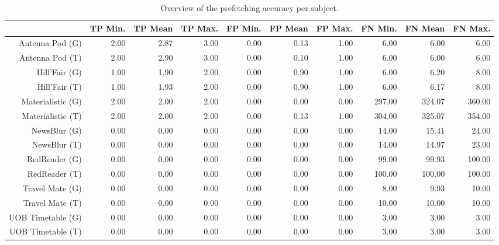 \begin{table}[ht]
\centering
\begin{tabular}{rrrrrrrrrr}
  \hline
 & TP Min. & TP Mean & TP Max. & FP Min. & FP Mean & FP Max. & FN Min. & FN Mean & FN Max. \\ 
  \hline
Antenna Pod (G) & 2.00 & 2.87 & 3.00 & 0.00 & 0.13 & 1.00 & 6.00 & 6.00 & 6.00 \\ 
  Antenna Pod (T) & 2.00 & 2.90 & 3.00 & 0.00 & 0.10 & 1.00 & 6.00 & 6.00 & 6.00 \\ 
  Hill'Fair (G) & 1.00 & 1.90 & 2.00 & 0.00 & 0.90 & 1.00 & 6.00 & 6.20 & 8.00 \\ 
  Hill'Fair (T) & 1.00 & 1.93 & 2.00 & 0.00 & 0.90 & 1.00 & 6.00 & 6.17 & 8.00 \\ 
  Materialistic (G) & 2.00 & 2.00 & 2.00 & 0.00 & 0.00 & 0.00 & 297.00 & 324.07 & 360.00 \\ 
  Materialistic (T) & 2.00 & 2.00 & 2.00 & 0.00 & 0.13 & 1.00 & 304.00 & 325.07 & 354.00 \\ 
  NewsBlur (G) & 0.00 & 0.00 & 0.00 & 0.00 & 0.00 & 0.00 & 14.00 & 15.41 & 24.00 \\ 
  NewsBlur (T) & 0.00 & 0.00 & 0.00 & 0.00 & 0.00 & 0.00 & 14.00 & 14.97 & 23.00 \\ 
  RedReader (G) & 0.00 & 0.00 & 0.00 & 0.00 & 0.00 & 0.00 & 99.00 & 99.93 & 100.00 \\ 
  RedReader (T) & 0.00 & 0.00 & 0.00 & 0.00 & 0.00 & 0.00 & 100.00 & 100.00 & 100.00 \\ 
  Travel Mate (G) & 0.00 & 0.00 & 0.00 & 0.00 & 0.00 & 0.00 & 8.00 & 9.93 & 10.00 \\ 
  Travel Mate (T) & 0.00 & 0.00 & 0.00 & 0.00 & 0.00 & 0.00 & 10.00 & 10.00 & 10.00 \\ 
  UOB Timetable (G) & 0.00 & 0.00 & 0.00 & 0.00 & 0.00 & 0.00 & 3.00 & 3.00 & 3.00 \\ 
  UOB Timetable (T) & 0.00 & 0.00 & 0.00 & 0.00 & 0.00 & 0.00 & 3.00 & 3.00 & 3.00 \\ 
   \hline
\end{tabular}
\caption{Overview of the prefetching accuracy per subject.} 
\label{tab:results:rq3:summary:subject:count}
\end{table}
